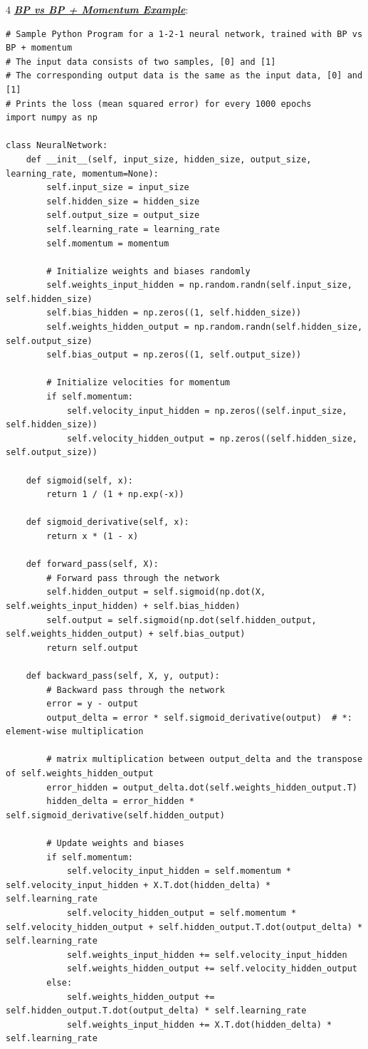 \documentclass[12pt]{article}
\newcommand{\bulletPoint}[1]{\ul{\textit{\textbf{#1}}}}
\begin{document}
\begin{multicols*}{4}
\bulletPoint{BP vs BP + Momentum Example}:
\begin{lstlisting}
# Sample Python Program for a 1-2-1 neural network, trained with BP vs BP + momentum
# The input data consists of two samples, [0] and [1]
# The corresponding output data is the same as the input data, [0] and [1]
# Prints the loss (mean squared error) for every 1000 epochs
import numpy as np

class NeuralNetwork:
    def __init__(self, input_size, hidden_size, output_size, learning_rate, momentum=None):
        self.input_size = input_size
        self.hidden_size = hidden_size
        self.output_size = output_size
        self.learning_rate = learning_rate
        self.momentum = momentum

        # Initialize weights and biases randomly
        self.weights_input_hidden = np.random.randn(self.input_size, self.hidden_size)
        self.bias_hidden = np.zeros((1, self.hidden_size))
        self.weights_hidden_output = np.random.randn(self.hidden_size, self.output_size)
        self.bias_output = np.zeros((1, self.output_size))

        # Initialize velocities for momentum
        if self.momentum:
            self.velocity_input_hidden = np.zeros((self.input_size, self.hidden_size))
            self.velocity_hidden_output = np.zeros((self.hidden_size, self.output_size))

    def sigmoid(self, x):
        return 1 / (1 + np.exp(-x))

    def sigmoid_derivative(self, x):
        return x * (1 - x)

    def forward_pass(self, X):
        # Forward pass through the network
        self.hidden_output = self.sigmoid(np.dot(X, self.weights_input_hidden) + self.bias_hidden)
        self.output = self.sigmoid(np.dot(self.hidden_output, self.weights_hidden_output) + self.bias_output)
        return self.output

    def backward_pass(self, X, y, output):
        # Backward pass through the network
        error = y - output
        output_delta = error * self.sigmoid_derivative(output)  # *: element-wise multiplication

        # matrix multiplication between output_delta and the transpose of self.weights_hidden_output
        error_hidden = output_delta.dot(self.weights_hidden_output.T)
        hidden_delta = error_hidden * self.sigmoid_derivative(self.hidden_output)

        # Update weights and biases
        if self.momentum:
            self.velocity_input_hidden = self.momentum * self.velocity_input_hidden + X.T.dot(hidden_delta) * self.learning_rate
            self.velocity_hidden_output = self.momentum * self.velocity_hidden_output + self.hidden_output.T.dot(output_delta) * self.learning_rate
            self.weights_input_hidden += self.velocity_input_hidden
            self.weights_hidden_output += self.velocity_hidden_output
        else:
            self.weights_hidden_output += self.hidden_output.T.dot(output_delta) * self.learning_rate
            self.weights_input_hidden += X.T.dot(hidden_delta) * self.learning_rate


\end{lstlisting}
\end{multicols*}
\end{document}
